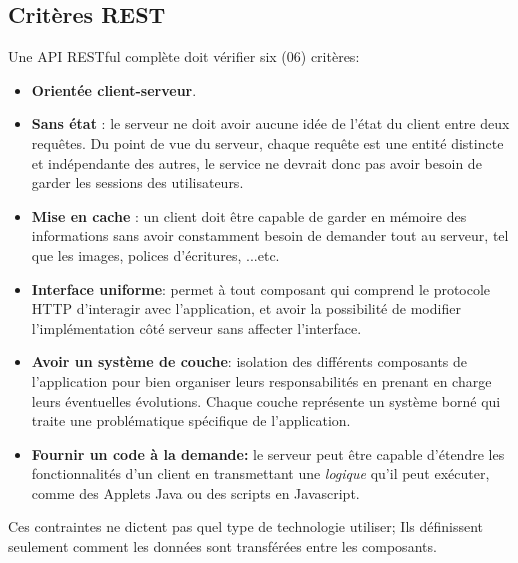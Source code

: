 \subsection{Critères REST}
Une API RESTful complète doit vérifier six (06) critères: \cite{refTutorialPointsREST}
\begin{itemize}
	\item \textbf{Orientée client-serveur}.
	      
	\item \textbf{Sans état} : le serveur ne doit avoir aucune idée de l'état du client entre deux requêtes. Du point de vue du serveur, chaque requête est une entité distincte et indépendante des autres, le service ne devrait donc pas avoir besoin de garder les sessions des utilisateurs.
	      
	\item \textbf{Mise en cache} : un client doit être capable de garder en mémoire des informations sans avoir constamment besoin de demander tout au serveur, tel que les images, polices d'écritures, ...etc.
	      
	\item \textbf{Interface uniforme}: permet à tout composant qui comprend le protocole HTTP d'interagir avec l'application, et avoir la possibilité de modifier l'implémentation côté serveur sans affecter l'interface.
	      
	\item \textbf{Avoir un système de couche}: isolation des différents composants de l'application pour bien organiser leurs responsabilités en prenant en charge leurs éventuelles évolutions. Chaque couche représente un système borné qui traite une problématique spécifique de l'application.
	      
	\item \textbf{Fournir un code à la demande: } le serveur peut être capable d'étendre les fonctionnalités d'un client en transmettant une \emph{logique} qu'il peut exécuter, comme des Applets Java ou des scripts en Javascript.
	      
\end{itemize}
Ces contraintes ne dictent pas quel type de technologie utiliser; Ils définissent seulement comment les données sont transférées entre les composants.

